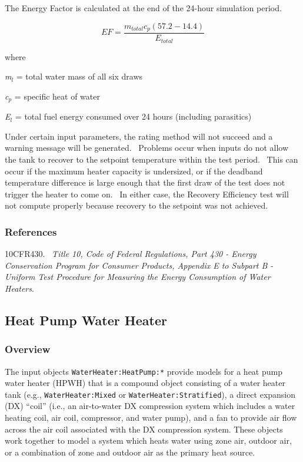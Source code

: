 The Energy Factor is calculated at the end of the 24-hour simulation period.

\begin{equation}
EF = \frac{{{m_{total}}{c_p}\left( {57.2 - 14.4} \right)}}{{{E_{total}}}}
\end{equation}

where

\emph{m\(_{l}\)} = total water mass of all six draws

\emph{c\(_{p}\)} = specific heat of water

\emph{E\(_{l}\)} = total fuel energy consumed over 24 hours (including parasitics)

Under certain input parameters, the rating method will not succeed and a warning message will be generated.~ Problems occur when inputs do not allow the tank to recover to the setpoint temperature within the test period.~ This can occur if the maximum heater capacity is undersized, or if the deadband temperature difference is large enough that the first draw of the test does not trigger the heater to come on.~ In either case, the Recovery Efficiency test will not compute properly because recovery to the setpoint was not achieved.

\subsubsection{References}\label{references-053}

10CFR430.~ \emph{Title 10, Code of Federal Regulations, Part 430 - Energy Conservation Program for Consumer Products, Appendix E to Subpart B - Uniform Test Procedure for Measuring the Energy Consumption of Water Heaters}.

\subsection{Heat Pump Water Heater}\label{heat-pump-water-heater}

\subsubsection{Overview}\label{overview-029}

The input objects \lstinline!WaterHeater:HeatPump:*! provide models for a heat pump water heater (HPWH) that is a compound object consisting of a water heater tank (e.g., \lstinline!WaterHeater:Mixed! or \lstinline!WaterHeater:Stratified!), a direct expansion (DX) ``coil'' (i.e., an air-to-water DX compression system which includes a water heating coil, air coil, compressor, and water pump), and a fan to provide air flow across the air coil associated with the DX compression system. These objects work together to model a system which heats water using zone air, outdoor air, or a combination of zone and outdoor air as the primary heat source.

